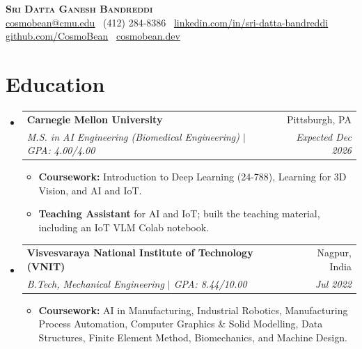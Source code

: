 \documentclass[letterpaper,10pt]{article}
\makeatletter
\newcommand{\resumeItem}[1]{
  \item\small{{#1 \vspace{-2pt}}}
}
\newcommand{\resumeSubheading}[4]{
  \vspace{-2pt}\item
    \begin{tabular*}{\linewidth}[t]{l@{\extracolsep{\fill}}r}
      \textbf{#1} & #2 \\
      \textit{\small#3} & \textit{\small #4} \\
    \end{tabular*}\vspace{-5pt}
}
\newcommand{\resumeSubHeadingListStart}{\begin{itemize}[leftmargin=0.15in, label={}]}
\newcommand{\resumeSubHeadingListEnd}{\end{itemize}}
\newcommand{\resumeItemListStart}{\begin{itemize}[leftmargin=0.28in, itemsep=1pt, topsep=2pt]}
\newcommand{\resumeItemListEnd}{\end{itemize}\vspace{-4pt}}
\makeatother
\begin{document}
\begin{center}
    \textbf{\LARGE \scshape Sri Datta Ganesh Bandreddi} \\ \vspace{2pt}
    \small \href{mailto:cosmobean@cmu.edu}{\underline{cosmobean@cmu.edu}}
    \textbullet\ (412) 284-8386 \textbullet\
    \href{http://linkedin.com/in/sri-datta-bandreddi}{\underline{linkedin.com/in/sri-datta-bandreddi}} \\ \vspace{2pt}
    \href{https://github.com/CosmoBean}{\underline{github.com/CosmoBean}}
    \textbullet\ \href{https://cosmobean.dev}{\underline{cosmobean.dev}}
\end{center}

\section{Education}
  \resumeSubHeadingListStart
    \resumeSubheading
      {Carnegie Mellon University}{Pittsburgh, PA}
      {M.S. in AI Engineering (Biomedical Engineering) $|$ GPA: 4.00/4.00}{Expected Dec 2026}
      \resumeItemListStart
        \resumeItem{\textbf{Coursework:} Introduction to Deep Learning (24-788), Learning for 3D Vision, and AI and IoT.}
        \resumeItem{\textbf{Teaching Assistant} for AI and IoT; built the teaching material, including an IoT VLM Colab notebook.}
      \resumeItemListEnd
    \resumeSubheading
      {Visvesvaraya National Institute of Technology (VNIT)}{Nagpur, India}
      {B.Tech, Mechanical Engineering $|$ GPA: 8.44/10.00}{Jul 2022}
      \resumeItemListStart
        \resumeItem{\textbf{Coursework:} AI in Manufacturing, Industrial Robotics, Manufacturing Process Automation, Computer Graphics \& Solid Modelling, Data Structures, Finite Element Method, Biomechanics, and Machine Design.}
      \resumeItemListEnd
  \resumeSubHeadingListEnd

\end{document}
